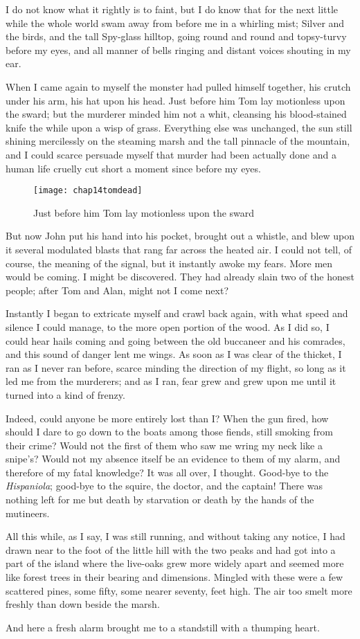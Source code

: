 I do not know what it rightly is to faint, but I do know that for the next little while the whole world swam away from before me in a whirling mist; Silver and the birds, and the tall Spy-glass hilltop, going round and round and topsy-turvy before my eyes, and all manner of bells ringing and distant voices shouting in my ear.

When I came again to myself the monster had pulled himself together, his crutch under his arm, his hat upon his head. Just before him Tom lay motionless upon the sward; but the murderer minded him not a whit, cleansing his blood-stained knife the while upon a wisp of grass. Everything else was unchanged, the sun still shining mercilessly on the steaming marsh and the tall pinnacle of the mountain, and I could scarce persuade myself that murder had been actually done and a human life cruelly cut short a moment since before my eyes.

 \begin{figure}[p]
\centering
\texttt{[image: chap14tomdead]}
\caption[\textbf{Tom lay motionless upon the sward}]{Just before him Tom lay motionless upon the sward}
\end{figure}

But now John put his hand into his pocket, brought out a whistle, and blew upon it several modulated blasts that rang far across the heated air. I could not tell, of course, the meaning of the signal, but it instantly awoke my fears. More men would be coming. I might be discovered. They had already slain two of the honest people; after Tom and Alan, might not I come next?

Instantly I began to extricate myself and crawl back again, with what speed and silence I could manage, to the more open portion of the wood. As I did so, I could hear hails coming and going between the old buccaneer and his comrades, and this sound of danger lent me wings. As soon as I was clear of the thicket, I ran as I never ran before, scarce minding the direction of my flight, so long as it led me from the murderers; and as I ran, fear grew and grew upon me until it turned into a kind of frenzy.

Indeed, could anyone be more entirely lost than I? When the gun fired, how should I dare to go down to the boats among those fiends, still smoking from their crime? Would not the first of them who saw me wring my neck like a snipe’s? Would not my absence itself be an evidence to them of my alarm, and therefore of my fatal knowledge? It was all over, I thought. Good-bye to the \textit{Hispaniola}; good-bye to the squire, the doctor, and the captain! There was nothing left for me but death by starvation or death by the hands of the mutineers.

All this while, as I say, I was still running, and without taking any notice, I had drawn near to the foot of the little hill with the two peaks and had got into a part of the island where the live-oaks grew more widely apart and seemed more like forest trees in their bearing and dimensions. Mingled with these were a few scattered pines, some fifty, some nearer seventy, feet high. The air too smelt more freshly than down beside the marsh.

And here a fresh alarm brought me to a standstill with a thumping heart.